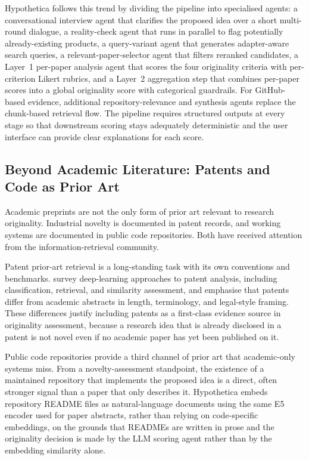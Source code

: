 Hypothetica follows this trend by dividing the pipeline into specialised agents: a conversational interview agent that clarifies the proposed idea over a short multi-round dialogue, a reality-check agent that runs in parallel to flag potentially already-existing products, a query-variant agent that generates adapter-aware search queries, a relevant-paper-selector agent that filters reranked candidates, a Layer~1 per-paper analysis agent that scores the four originality criteria with per-criterion Likert rubrics, and a Layer~2 aggregation step that combines per-paper scores into a global originality score with categorical guardrails. For GitHub-based evidence, additional repository-relevance and synthesis agents replace the chunk-based retrieval flow. The pipeline requires structured outputs at every stage so that downstream scoring stays adequately deterministic and the user interface can provide clear explanations for each score.

\subsection{Beyond Academic Literature: Patents and Code as Prior Art}

Academic preprints are not the only form of prior art relevant to research originality. Industrial novelty is documented in patent records, and working systems are documented in public code repositories. Both have received attention from the information-retrieval community.

Patent prior-art retrieval is a long-standing task with its own conventions and benchmarks. \citet{krestel2021patents} survey deep-learning approaches to patent analysis, including classification, retrieval, and similarity assessment, and emphasise that patents differ from academic abstracts in length, terminology, and legal-style framing. These differences justify including patents as a first-class evidence source in originality assessment, because a research idea that is already disclosed in a patent is not novel even if no academic paper has yet been published on it.

Public code repositories provide a third channel of prior art that academic-only systems miss. From a novelty-assessment standpoint, the existence of a maintained repository that implements the proposed idea is a direct, often stronger signal than a paper that only describes it. Hypothetica embeds repository README files as natural-language documents using the same E5 encoder used for paper abstracts, rather than relying on code-specific embeddings, on the grounds that READMEs are written in prose and the originality decision is made by the LLM scoring agent rather than by the embedding similarity alone.


